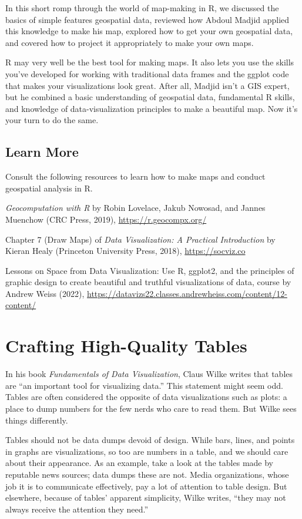 \documentclass[
]{book}
\begin{document}
In this short romp through the world of map-making in R, we discussed the basics of simple features geospatial data, reviewed how Abdoul Madjid applied this knowledge to make his map, explored how to get your own geospatial data, and covered how to project it appropriately to make your own maps.

R may very well be the best tool for making maps. It also lets you use the skills you've developed for working with traditional data frames and the ggplot code that makes your visualizations look great. After all, Madjid isn't a GIS expert, but he combined a basic understanding of geospatial data, fundamental R skills, and knowledge of data-visualization principles to make a beautiful map. Now it's your turn to do the same.

\hypertarget{learn-more-3}{%
\section*{Learn More}\label{learn-more-3}}

Consult the following resources to learn how to make maps and conduct geospatial analysis in R.

\emph{Geocomputation with R} by Robin Lovelace, Jakub Nowosad, and Jannes Muenchow (CRC Press, 2019), \url{https://r.geocompx.org/}

Chapter 7 (Draw Maps) of \emph{Data Visualization: A Practical Introduction} by Kieran Healy (Princeton University Press, 2018), \url{https://socviz.co}

Lessons on Space from Data Visualization: Use R, ggplot2, and the principles of graphic design to create beautiful and truthful visualizations of data, course by Andrew Weiss (2022), \url{https://datavizs22.classes.andrewheiss.com/content/12-content/}

\hypertarget{tables-chapter}{%
\chapter{Crafting High-Quality Tables}\label{tables-chapter}}

In his book \emph{Fundamentals of Data Visualization}, Claus Wilke writes that tables are ``an important tool for visualizing data.'' This statement might seem odd. Tables are often considered the opposite of data visualizations such as plots: a place to dump numbers for the few nerds who care to read them. But Wilke sees things differently.

Tables should not be data dumps devoid of design. While bars, lines, and points in graphs are visualizations, so too are numbers in a table, and we should care about their appearance. As an example, take a look at the tables made by reputable news sources; data dumps these are not. Media organizations, whose job it is to communicate effectively, pay a lot of attention to table design. But elsewhere, because of tables' apparent simplicity, Wilke writes, ``they may not always receive the attention they need.''
\end{document}
